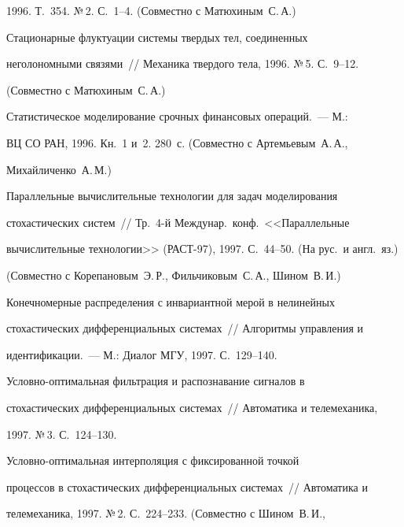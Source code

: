  1996. Т.~354. №\,2. С.~1--4. (Совместно с Матюхиным~С.\,А.)





 Стационарные флуктуации системы твердых тел, соединенных


неголономными связями~// Механика твердого тела, 1996. №\,5. С.~9--12.


(Совместно с Матюхиным~С.\,А.)





 Статистическое моделирование срочных финансовых операций.~--- М.:


ВЦ СО РАН, 1996. Кн.~1 и~2. 280~с. (Совместно с Артемьевым~А.\,А.,


Михайличенко~А.\,М.)










 Параллельные вычислительные технологии для задач моделирования


стохастических систем~// Тр.\ 4-й Междунар.\ конф.\ <<Параллельные


вычислительные технологии>> (РАСТ-97), 1997. С.~44--50. (На рус.\ и англ.\ яз.)


(Совместно с Корепановым~Э.\,Р., Фильчиковым~С.\,А., Шином~В.\,И.)





 Конечномерные распределения с инвариантной мерой в нелинейных


стохастических дифференциальных системах~// Алгоритмы управления и


идентификации.~--- М.: Диалог МГУ, 1997. С.~129--140.





 Условно-оптимальная фильтрация и распознавание сигналов в


стохастических дифференциальных системах~// Автоматика и телемеханика,


1997. №\,3. С.~124--130.





 Условно-оптимальная интерполяция с фиксированной точкой


процессов в стохастических дифференциальных системах~// Автоматика и


телемеханика, 1997. №\,2. С.~224--233. (Совместно с Шином~В.\,И.,


